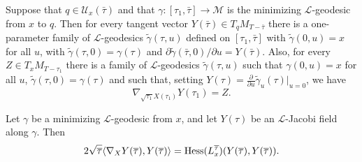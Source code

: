 \begin{lemma}\label{lem:l-geodesic-family-existence}

Suppose that $q\in {\mathcal U}_x(\bar\tau)$  and that $\gamma\colon
[\tau_1,\bar\tau]\to{\mathcal M}$ is the minimizing ${\mathcal
L}$-geodesic from $x$ to $q$. Then for every tangent vector $
Y(\bar\tau)\in T_qM_{T-\bar\tau}$ there is a one-parameter family of
${\mathcal L}$-geodesics   $\tilde\gamma(\tau,u)$ defined on
$[\tau_1,\bar\tau]$ with $\tilde\gamma(0,u)=x$ for all $u$, with
$\tilde\gamma(\tau,0)=\gamma(\tau)$ and $\partial\tilde
\gamma(\bar\tau,0)/\partial u=Y(\bar \tau)$. Also, for every $Z\in
T_xM_{T-\tau_1}$ there is a family of ${\mathcal L}$-geodesics
$\tilde\gamma(\tau,u)$ such that $\gamma(0,u)=x$ for all $u$,
$\tilde\gamma(\tau,0)=\gamma(\tau)$ and such that, setting
$Y(\tau)=\frac{\partial}{\partial u} \tilde\gamma_u(\tau)|_{u=0}$,
we have
$$\nabla_{\sqrt{\tau_1}X(\tau_1)}Y(\tau_1)=Z.$$
\end{lemma}

\begin{lemma}\label{lem:l-length-hessian-jacobi-formula}
\label{Jacobi}

Let  $\gamma$ be a minimizing ${\mathcal L}$-geodesic from $x$, and
let $Y(\tau)$ be an ${\mathcal L}$-Jacobi field along $\gamma$. Then
$$2\sqrt{\overline\tau}\langle\nabla_XY(\overline\tau),Y(\overline\tau)\rangle = \operatorname{Hess}(L_x^{\overline\tau})(Y(\overline\tau),
Y(\overline\tau)).$$
\end{lemma}

